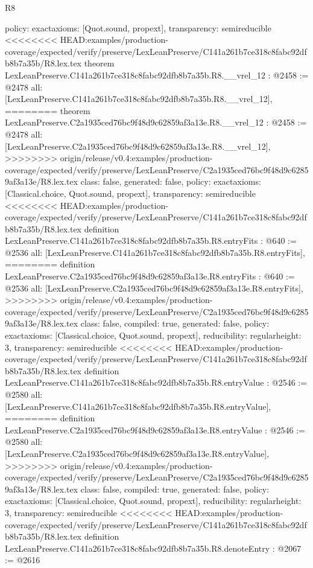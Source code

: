\begin{lexlean}{R8}
\begin{coremodule}
{{{{{{{{{{{{{{{{{{{{{{{{{{{{{{{{{  policy: exact{axioms: [Quot.sound, propext]},
  transparency: semireducible
}
<<<<<<<< HEAD:examples/production-coverage/expected/verify/preserve/LexLeanPreserve/C141a261b7ce318c8fabc92dfb8b7a35b/R8.lex.tex
theorem LexLeanPreserve.C141a261b7ce318c8fabc92dfb8b7a35b.R8.__vrel_12 : @2458 := @2478 {
  all: [LexLeanPreserve.C141a261b7ce318c8fabc92dfb8b7a35b.R8.__vrel_12],
========
theorem LexLeanPreserve.C2a1935ced76bc9f48d9c62859af3a13e.R8.__vrel_12 : @2458 := @2478 {
  all: [LexLeanPreserve.C2a1935ced76bc9f48d9c62859af3a13e.R8.__vrel_12],
>>>>>>>> origin/release/v0.4:examples/production-coverage/expected/verify/preserve/LexLeanPreserve/C2a1935ced76bc9f48d9c62859af3a13e/R8.lex.tex
  class: false,
  generated: false,
  policy: exact{axioms: [Classical.choice, Quot.sound, propext]},
  transparency: semireducible
}
<<<<<<<< HEAD:examples/production-coverage/expected/verify/preserve/LexLeanPreserve/C141a261b7ce318c8fabc92dfb8b7a35b/R8.lex.tex
definition LexLeanPreserve.C141a261b7ce318c8fabc92dfb8b7a35b.R8.entryFits : @640 := @2536 {
  all: [LexLeanPreserve.C141a261b7ce318c8fabc92dfb8b7a35b.R8.entryFits],
========
definition LexLeanPreserve.C2a1935ced76bc9f48d9c62859af3a13e.R8.entryFits : @640 := @2536 {
  all: [LexLeanPreserve.C2a1935ced76bc9f48d9c62859af3a13e.R8.entryFits],
>>>>>>>> origin/release/v0.4:examples/production-coverage/expected/verify/preserve/LexLeanPreserve/C2a1935ced76bc9f48d9c62859af3a13e/R8.lex.tex
  class: false,
  compiled: true,
  generated: false,
  policy: exact{axioms: [Classical.choice, Quot.sound, propext]},
  reducibility: regular{height: 3},
  transparency: semireducible
}
<<<<<<<< HEAD:examples/production-coverage/expected/verify/preserve/LexLeanPreserve/C141a261b7ce318c8fabc92dfb8b7a35b/R8.lex.tex
definition LexLeanPreserve.C141a261b7ce318c8fabc92dfb8b7a35b.R8.entryValue : @2546 := @2580 {
  all: [LexLeanPreserve.C141a261b7ce318c8fabc92dfb8b7a35b.R8.entryValue],
========
definition LexLeanPreserve.C2a1935ced76bc9f48d9c62859af3a13e.R8.entryValue : @2546 := @2580 {
  all: [LexLeanPreserve.C2a1935ced76bc9f48d9c62859af3a13e.R8.entryValue],
>>>>>>>> origin/release/v0.4:examples/production-coverage/expected/verify/preserve/LexLeanPreserve/C2a1935ced76bc9f48d9c62859af3a13e/R8.lex.tex
  class: false,
  compiled: true,
  generated: false,
  policy: exact{axioms: [Classical.choice, Quot.sound, propext]},
  reducibility: regular{height: 3},
  transparency: semireducible
}
<<<<<<<< HEAD:examples/production-coverage/expected/verify/preserve/LexLeanPreserve/C141a261b7ce318c8fabc92dfb8b7a35b/R8.lex.tex
definition LexLeanPreserve.C141a261b7ce318c8fabc92dfb8b7a35b.R8.denoteEntry : @2067 := @2616 {
}}}}}}}}}}}}}}}}}}}}}}}}}}}}}}}}}}}}
\end{coremodule}
\end{lexlean}
